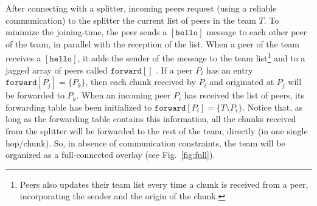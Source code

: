 

\label{sec:joining}

After connecting with a splitter, incoming peers request (using a
reliable communication) to the splitter the current list of peers in
the team $T$. To minimize the \gls{joining-time}, the peer sends a
$[\mathtt{hello}]$ message to each other peer of the team, in parallel
with the reception of the list. When a peer of the team receives a
$[\mathtt{hello}]$, it adds the sender of the message to the team
list\footnote{Peers also updates their team list every time a chunk is
  received from a peer, incorporating the sender and the origin of the
  chunk.} and to a jagged array of peers called $\mathtt{forward}[]$
. If a peer $P_i$ has an entry
$\mathtt{forward}[P_j]=\{P_k\}$, then each chunk received by $P_i$ and
originated at $P_j$ will be forwarded to $P_k$. When an incoming peer
$P_i$ has received the list of peers, its forwarding table has been
initialized to $\mathtt{forward}[P_i]=\{T\setminus P_i\}$. Notice
that, as long as the forwarding table contains this information, all
the chunks received from the splitter will be forwarded to the rest of
the team, directly (in one single hop/chunk). So, in absence of
communication constraints, the team will be organized as a
full-connected overlay (see Fig.~\ref{fig:full}).

